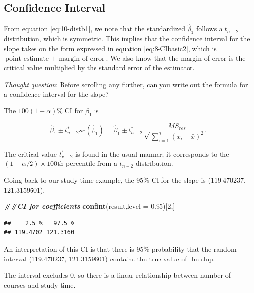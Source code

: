 \documentclass[
]{book}
\newenvironment{Shaded}{\begin{snugshade}}{\end{snugshade}}
\newcommand{\AttributeTok}[1]{\textcolor[rgb]{0.13,0.29,0.53}{#1}}
\newcommand{\DecValTok}[1]{\textcolor[rgb]{0.00,0.00,0.81}{#1}}
\newcommand{\DocumentationTok}[1]{\textcolor[rgb]{0.56,0.35,0.01}{\textbf{\textit{#1}}}}
\newcommand{\FloatTok}[1]{\textcolor[rgb]{0.00,0.00,0.81}{#1}}
\newcommand{\FunctionTok}[1]{\textcolor[rgb]{0.13,0.29,0.53}{\textbf{#1}}}
\newcommand{\NormalTok}[1]{#1}
\begin{document}
\hypertarget{confidence-interval}{%
\subsection{Confidence Interval}\label{confidence-interval}}

From equation \eqref{eq:10-distb1}, we note that the standardized \(\hat{\beta}_1\) follows a \(t_{n-2}\) distribution, which is symmetric. This implies that the confidence interval for the slope takes on the form expressed in equation \eqref{eq:8-CIbasic2}, which is \(\text{point estimate } \pm \text{ margin of error}\). We also know that the margin of error is the critical value multiplied by the standard error of the estimator.

\emph{Thought question}: Before scrolling any further, can you write out the formula for a confidence interval for the slope?

The \(100(1-\alpha)\%\) CI for \(\beta_1\) is

\begin{equation} 
\hat{\beta}_1 \pm t_{n-2}^*  se(\hat{\beta}_1) = \hat{\beta}_1 \pm t_{n-2}^* {\sqrt\frac{MS_{res}}{\sum_{i=1}^n(x_i - \bar{x})^{2}}}.
\label{eq:10-CIb1}
\end{equation}

The critical value \(t_{n-2}^*\) is found in the usual manner; it corresponds to the \((1 - \alpha/2) \times 100\)th percentile from a \(t_{n-2}\) distribution.

Going back to our study time example, the 95\% CI for the slope is (119.470237, 121.3159601).

\begin{Shaded}
\begin{Highlighting}[]
\DocumentationTok{\#\#CI for coefficients}
\FunctionTok{confint}\NormalTok{(result,}\AttributeTok{level =} \FloatTok{0.95}\NormalTok{)[}\DecValTok{2}\NormalTok{,]}
\end{Highlighting}
\end{Shaded}

\begin{verbatim}
##    2.5 %   97.5 % 
## 119.4702 121.3160
\end{verbatim}

An interpretation of this CI is that there is 95\% probability that the random interval (119.470237, 121.3159601) contains the true value of the slop.

The interval excludes 0, so there is a linear relationship between number of courses and study time.
\end{document}
